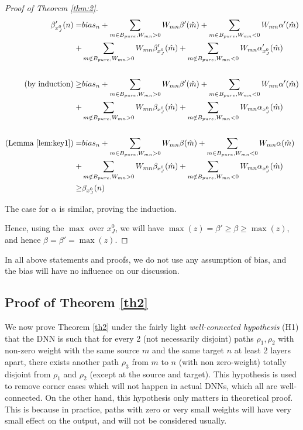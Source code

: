 \begin{proof}[Proof of Theorem \ref{thm:2}]
\begin{align*}
\beta'_{x_J^0}(n) = & {bias}_n+\sum_{m\in B_{pure},W_{mn}>0} W_{mn} \beta'(\hat{m})+\sum_{m\in B_{pure},W_{mn}<0} W_{mn} \alpha'(\hat{m})\\
+&\sum_{m\notin B_{pure},W_{mn}>0} W_{mn} \beta'_{x_J^0}(\hat{m})+\sum_{m\notin B_{pure},W_{mn}<0} W_{mn} \alpha'_{x_J^0}(\hat{m})\\
\\
(\text{by induction})\geq & {bias}_n+\sum_{m\in B_{pure},W_{mn}>0} W_{mn} \beta'(\hat{m})+\sum_{m\in B_{pure},W_{mn}<0} W_{mn} \alpha'(\hat{m})\\
+&\sum_{m\notin B_{pure},W_{mn}>0} W_{mn} \beta_{x_J^0}(\hat{m})+\sum_{m\notin B_{pure},W_{mn}<0} W_{mn} \alpha_{x_J^0}(\hat{m})\\
\\
(\text{Lemma \ref{lem:key1}})= & {bias}_n+\sum_{m\in B_{pure},W_{mn}>0} W_{mn} \beta(\hat{m})+\sum_{m\in B_{pure},W_{mn}<0} W_{mn} \alpha(\hat{m})\\
+&\sum_{m\notin B_{pure},W_{mn}>0} W_{mn} \beta_{x_J^0}(\hat{m})+\sum_{m\notin B_{pure},W_{mn}<0} W_{mn} \alpha_{x_J^0}(\hat{m})\\
\geq & \beta_{x_J^0}(n)
\end{align*} 

The case for $\alpha$ is similar, proving the induction.

Hence, using the $\max$ over ${x_J^0}$, 
we will have $\max(z) = \beta'\geq \beta \geq \max(z)$, and hence $\beta=\beta'=\max(z)$.\end{proof}

{\color{red} In all above statements and proofs, we do not use any assumption of bias, and the bias will have no influence on our discussion. }

\subsection{Proof of Theorem \ref{th2}}


We now prove Theorem \ref{th2} under the fairly light {\em well-connected hypothesis} (H1) that the DNN is such that for every 2 (not necessarily disjoint) paths $\rho_1,\rho_2$ with non-zero weight with the same source $m$ and the same target $n$ at least 2 layers apart, there exists another path $\rho_3$ from $m$ to $n$ (with non zero-weight) totally disjoint from $\rho_1$ and $\rho_2$ (except at the source and target). This hypothesis is used to remove corner cases which will not happen in actual DNNs, which all are well-connected. {\color{red} On the other hand, this hypothesis only matters in theoretical proof. This is because in practice, paths with zero or very small weights will have very small effect on the output, and will not be considered usually.} 

